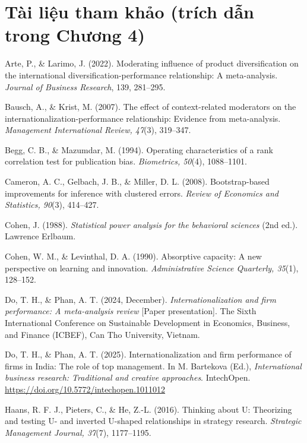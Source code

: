 \documentclass[
  a4paper,
  13pt]{extreport}
\begin{document}
\hypertarget{tuxe0i-liux1ec7u-tham-khux1ea3o-truxedch-dux1eabn-trong-chux1b0ux1a1ng-4}{%
\section{Tài liệu tham khảo (trích dẫn trong Chương
4)}\label{tuxe0i-liux1ec7u-tham-khux1ea3o-truxedch-dux1eabn-trong-chux1b0ux1a1ng-4}}

Arte, P., \& Larimo, J. (2022). Moderating influence of product
diversification on the international diversification-performance
relationship: A meta-analysis. \emph{Journal of Business Research}, 139,
281--295.

Bausch, A., \& Krist, M. (2007). The effect of context-related
moderators on the internationalization-performance relationship:
Evidence from meta-analysis. \emph{Management International Review,
47}(3), 319--347.

Begg, C. B., \& Mazumdar, M. (1994). Operating characteristics of a rank
correlation test for publication bias. \emph{Biometrics, 50}(4),
1088--1101.

Cameron, A. C., Gelbach, J. B., \& Miller, D. L. (2008). Bootstrap-based
improvements for inference with clustered errors. \emph{Review of
Economics and Statistics, 90}(3), 414--427.

Cohen, J. (1988). \emph{Statistical power analysis for the behavioral
sciences} (2nd ed.). Lawrence Erlbaum.

Cohen, W. M., \& Levinthal, D. A. (1990). Absorptive capacity: A new
perspective on learning and innovation. \emph{Administrative Science
Quarterly, 35}(1), 128--152.

Do, T. H., \& Phan, A. T. (2024, December). \emph{Internationalization
and firm performance: A meta-analysis review} {[}Paper presentation{]}.
The Sixth International Conference on Sustainable Development in
Economics, Business, and Finance (ICBEF), Can Tho University, Vietnam.

Do, T. H., \& Phan, A. T. (2025). Internationalization and firm
performance of firms in India: The role of top management. In M.
Bartekova (Ed.), \emph{International business research: Traditional and
creative approaches}. IntechOpen.
\url{https://doi.org/10.5772/intechopen.1011012}

Haans, R. F. J., Pieters, C., \& He, Z.-L. (2016). Thinking about U:
Theorizing and testing U- and inverted U-shaped relationships in
strategy research. \emph{Strategic Management Journal, 37}(7),
1177--1195.
\end{document}
